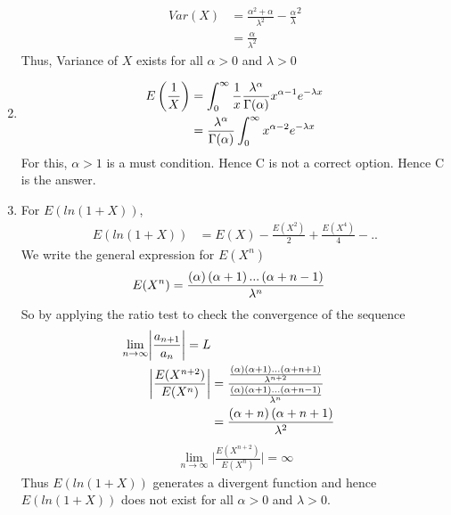 \documentclass{beamer}
\begin{document}
\begin{frame}[allowframebreaks]
\begin{enumerate}
{\begin{align}
\end{align}
\begin{align}
{Var}(X) &= \frac{{\alpha}^2+{\alpha}}{{\lambda}^2} - {\frac{{\alpha}}{{\lambda}}} ^2 \\
&= \frac{{\alpha}}{{\lambda}^2}
\end{align}
Thus, Variance of $X$ exists for all $\alpha > 0$ and $\lambda > 0$
}
\item {
\begin{align}
E\left(\frac{1}{X}\right)&= \int_{0}^{\infty} \frac{1}{x}\frac{\lambda^{\alpha}}{\Gamma(\alpha)}x^{\alpha - 1} e^{-\lambda x}\\
&= \frac{\lambda^{\alpha}}{\Gamma(\alpha)} \int_{0}^{\infty}x^{\alpha-2} e^{-\lambda x}
\end{align}
For this, $\alpha >1$ is a must condition. Hence C is not a correct option.
Hence C is the answer.
}
\item
{
For $E(ln(1+X))$,
\begin{align}
E(ln(1+X))&=E(X)-\frac{E(X^2)}{2}+\frac{E(X^4)}{4}-..
\end{align}
We write the general expression for $E(X^n)$
\begin{align}
E(X^n)&=\frac{\left(\alpha\right)\left(\alpha+1\right)...\left(\alpha+n-1\right)}{{\lambda}^n}
\end{align}
So by applying the ratio test to check the convergence of the sequence
\begin{align}
\lim_{n \to \infty}\biggr \rvert \frac{a_{n+1}}{a_n}\biggr \rvert = L\\
\biggr \rvert \frac{E(X^{n+2})}{E(X^n)}\biggr \rvert&=\frac{\frac{\left(\alpha\right)\left(\alpha+1\right)...\left(\alpha+n+1\right)}{{\lambda}^{n+2}}}{\frac{\left(\alpha\right)\left(\alpha+1\right)...\left(\alpha+n-1\right)}{{\lambda}^n}}\\
&=\frac{\left(\alpha+n\right)\left(\alpha+n+1\right)}{{\lambda}^2}
\end{align}
\begin{align}
\lim_{n \to \infty}\biggr \rvert\frac{E(X^{n+2})}{E(X^n)}\biggr \rvert=\infty
\end{align}
Thus $E(ln(1+X))$ generates a divergent function and hence $E(ln(1+X))$ does not exist for all $\alpha > 0$ and $ \lambda > 0$.
}
\end{enumerate}
\end{frame}
\end{document}
